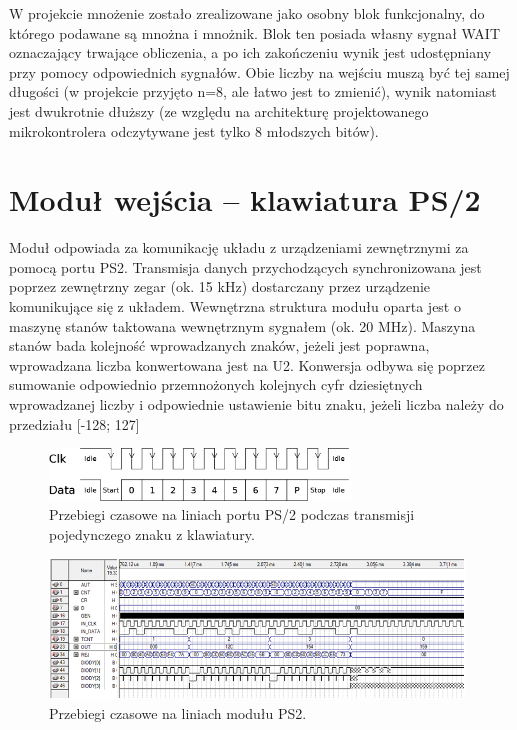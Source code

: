 \documentclass[a4paper,12pt]{report}
\begin{document}
W projekcie mnożenie zostało zrealizowane jako osobny blok funkcjonalny, do którego podawane są mnożna i mnożnik. Blok ten posiada własny sygnał WAIT oznaczający trwające obliczenia, a po ich zakończeniu wynik jest udostępniany przy pomocy odpowiednich sygnałów. Obie liczby na wejściu muszą być tej samej długości (w projekcie przyjęto n=8, ale łatwo jest to zmienić), wynik natomiast jest dwukrotnie dłuższy (ze względu na architekturę projektowanego mikrokontrolera odczytywane jest tylko 8 młodszych bitów).

\section{Moduł wejścia -- klawiatura PS/2}

Moduł odpowiada za komunikację układu z urządzeniami zewnętrznymi za pomocą portu PS2. Transmisja danych przychodzących synchronizowana jest poprzez zewnętrzny zegar (ok. 15 kHz) dostarczany przez urządzenie komunikujące się z układem. Wewnętrzna struktura modułu oparta jest o maszynę stanów taktowana wewnętrznym sygnałem (ok. 20 MHz).  Maszyna stanów bada kolejność wprowadzanych znaków, jeżeli jest poprawna, wprowadzana liczba konwertowana jest na U2. Konwersja odbywa się poprzez sumowanie odpowiednio przemnożonych kolejnych cyfr dziesiętnych wprowadzanej liczby i odpowiednie ustawienie bitu znaku, jeżeli liczba należy do przedziału [-128; 127]

\begin{figure}[h]
\centering
\includegraphics[width=8cm]{./pict/PS2.png}
\caption{Przebiegi czasowe na liniach portu PS/2 podczas transmisji pojedynczego znaku z klawiatury.}
\label{fig:ps2}
\end{figure}

\begin{figure}[h]
\centering
\includegraphics[width=11cm]{./pict/PS2_sim.png}
\caption{Przebiegi czasowe na liniach modułu PS2.}
\label{fig:ps2_sim}
\end{figure}
\end{document}
